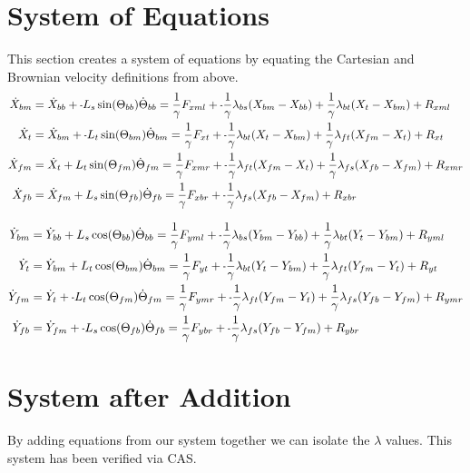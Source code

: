 \documentclass[11pt, landscape]{article}
\newcommand{\mn}{\scalebox{0.7}[1.0]{-}}
\begin{document}
\section{System of Equations}
This section creates a system of equations by equating the Cartesian and Brownian velocity definitions from above. \\

\begin{align}  
  \dot{X}_{bm} &= \dot{X}_{bb} + \mn L_{s}\sin(\Theta_{bb})\dot{\Theta}_{bb} = \frac{1}{\gamma}F_{xml} + \mn\frac{1}{\gamma}\lambda_{bs}(X_{bm} - X_{bb}) + \frac{1}{\gamma}\lambda_{bt}(X_{t } - X_{bm}) + R_{xml} \\
  \dot{X}_{t}  &= \dot{X}_{bm} + \mn L_{t}\sin(\Theta_{bm})\dot{\Theta}_{bm} = \frac{1}{\gamma}F_{xt } + \mn\frac{1}{\gamma}\lambda_{bt}(X_{t } - X_{bm}) + \frac{1}{\gamma}\lambda_{ft}(X_{fm} - X_{t }) + R_{xt } \\
  \dot{X}_{fm} &= \dot{X}_{t } + L_{t}\sin(\Theta_{fm})\dot{\Theta}_{fm} = \frac{1}{\gamma}F_{xmr} + \mn\frac{1}{\gamma}\lambda_{ft}(X_{fm} - X_{t }) + \frac{1}{\gamma}\lambda_{fs}(X_{fb} - X_{fm}) + R_{xmr} \\
  \dot{X}_{fb} &= \dot{X}_{fm} + L_{s}\sin(\Theta_{fb})\dot{\Theta}_{fb} = \frac{1}{\gamma}F_{xbr} + \mn\frac{1}{\gamma}\lambda_{fs}(X_{fb} - X_{fm}) + R_{xbr}
\end{align}

\begin{align}  
  \dot{Y}_{bm} &= \dot{Y}_{bb} + L_{s}\cos(\Theta_{bb})\dot{\Theta}_{bb} = \frac{1}{\gamma}F_{yml} + \mn\frac{1}{\gamma}\lambda_{bs}(Y_{bm} - Y_{bb}) + \frac{1}{\gamma}\lambda_{bt}(Y_{t } - Y_{bm}) + R_{yml} \\
  \dot{Y}_{t}  &= \dot{Y}_{bm} + L_{t}\cos(\Theta_{bm})\dot{\Theta}_{bm} = \frac{1}{\gamma}F_{yt } + \mn\frac{1}{\gamma}\lambda_{bt}(Y_{t } - Y_{bm}) + \frac{1}{\gamma}\lambda_{ft}(Y_{fm} - Y_{t }) + R_{yt } \\
  \dot{Y}_{fm} &= \dot{Y}_{t } + \mn L_{t}\cos(\Theta_{fm})\dot{\Theta}_{fm} = \frac{1}{\gamma}F_{ymr} + \mn\frac{1}{\gamma}\lambda_{ft}(Y_{fm} - Y_{t }) + \frac{1}{\gamma}\lambda_{fs}(Y_{fb} - Y_{fm}) + R_{ymr} \\
  \dot{Y}_{fb} &= \dot{Y}_{fm} + \mn L_{s}\cos(\Theta_{fb})\dot{\Theta}_{fb} = \frac{1}{\gamma}F_{ybr} + \mn\frac{1}{\gamma}\lambda_{fs}(Y_{fb} - Y_{fm}) + R_{ybr}
\end{align}

\section{System after Addition}
By adding equations from our system together we can isolate the $\lambda$ values. This system has been verified via CAS.\\
\end{document}
